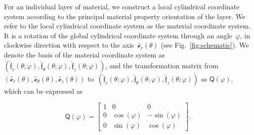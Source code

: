 \documentclass[preprint,12pt,times]{elsarticle}
\numberwithin{equation}{section}
\newcommand{\physe}{\hat{\mathscr{e}}} %
\newcommand{\physf}{\hat{\boldsymbol{\mathfrak{f}}}}
\renewcommand{\u}[1]{\boldsymbol{#1}}
\newcommand{\usf}[1]{\u{\mathsf #1}}
\newcommand{\pr}[1]{\left( #1 \right)}
\renewcommand{\>}{$\Rightarrow$}
\begin{document}
For an individual layer of material, we construct a local cylindrical coordinate system according to the principal material property orientation of the layer. We refer to the local cylindrical coordinate system as the material coordinate system. It is a rotation of the global cylindrical coordinate system through an angle~$\varphi$, in clockwise direction with respect to the axis~$\physe_{r}(\theta)$ (see Fig.~\ref{fig:schematic}). We denote the basis of the material coordinate system as~$\pr{\physf_{r}(\theta;\varphi),\physf_{\theta}(\theta;\varphi),\physf_{z}(\theta;\varphi)}$,
and the transformation matrix from~$(\physe_{r}(\theta),\physe_{\theta}(\theta),\physe_{z}(\theta))$ to~$\pr{\physf_{r}(\theta;\varphi),\physf_{\theta}(\theta;\varphi),\physf_{z}(\theta;\varphi)}$ as $\usf{Q}(\varphi)$, which can be expressed as

\begin{equation}
\usf{Q}(\varphi)
= \begin{bmatrix}
1 & 0 & 0 \\
 0 & \cos(\varphi) & -\sin(\varphi) \\
 0 & \sin(\varphi) & \cos(\varphi)
 \end{bmatrix}.
\end{equation}
\end{document}
